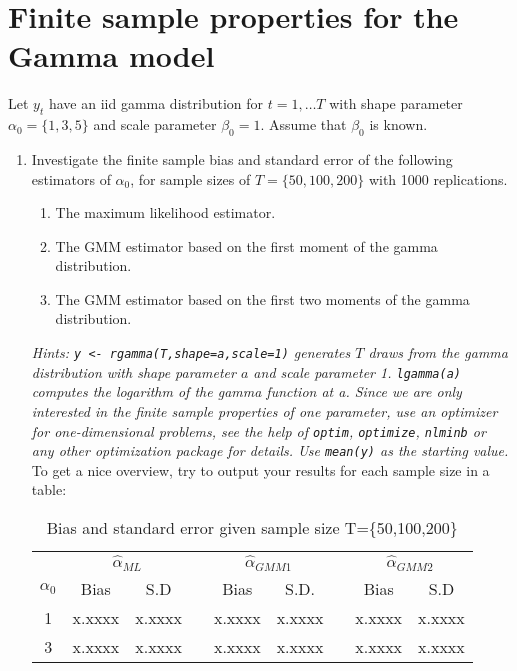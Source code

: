 \documentclass{article}
\begin{document}
\section{Finite sample properties for the Gamma model}
Let $y_t$ have an iid gamma distribution for $t=1,\dots T$ with shape parameter $\alpha_0=\{1,3,5\}$ and scale parameter $\beta_0=1$. Assume that $\beta_0$ is known.
\begin{enumerate}[label=(\alph*)]
\item Investigate the finite sample bias and standard error of the following estimators of $\alpha_0$, for sample sizes of $T=\{50,100,200\}$ with 1000 replications.
    \begin{enumerate}[label=(\roman*)]
      \item The maximum likelihood estimator.
      \item The GMM estimator based on the first moment of the gamma distribution.
      \item The GMM estimator based on the first two moments of the gamma distribution.
    \end{enumerate}
    \emph{Hints: \texttt{y <- rgamma(T,shape=a,scale=1)} generates $T$ draws from the gamma distribution with shape parameter $a$ and scale parameter 1. \texttt{lgamma(a)} computes the logarithm of the gamma function at a. Since we are only interested in the finite sample properties of one parameter, use an optimizer for one-dimensional problems, see the help of \texttt{optim}, \texttt{optimize}, \texttt{nlminb} or any other optimization package for details. Use \texttt{mean(y)} as the starting value.}\\
    To get a nice overview, try to output your results for each sample size in a table:
\begin{table}[h]
\centering
\caption{Bias and standard error given sample size T=\{50,100,200\}}
\begin{tabular}{ccccccccc}
\toprule
           & \multicolumn{2}{c}{$\hat{\alpha}_{ML}$} && \multicolumn{2}{c}{$\hat{\alpha}_{GMM1}$} && \multicolumn{2}{c}{$\hat{\alpha}_{GMM2}$} \\\cmidrule{2-3}\cmidrule{5-6}\cmidrule{8-9}
$\alpha_0$ & Bias               & S.D                && Bias                & S.D.                && Bias                & S.D                 \\\midrule
1          & x.xxxx             & x.xxxx             && x.xxxx              & x.xxxx              && x.xxxx              & x.xxxx              \\
3          & x.xxxx             & x.xxxx             && x.xxxx              & x.xxxx              && x.xxxx              & x.xxxx              \\

\end{tabular}
\end{table}
\end{enumerate}
\end{document}
